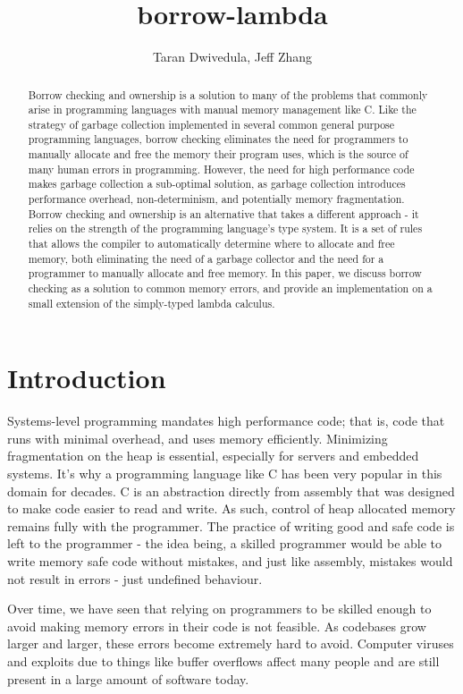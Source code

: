 \documentclass[letterpaper,11pt]{article}
\title{borrow-lambda}
\author{Taran Dwivedula, Jeff Zhang}
\begin{document}
\maketitle

\begin{abstract}
    Borrow checking and ownership is a solution to many of the problems that commonly arise in programming languages with manual memory management like C.
    Like the strategy of garbage collection implemented in several common general purpose programming languages, borrow checking eliminates the
    need for programmers to manually allocate and free the memory their program uses, which is the source of many human errors in programming.
    However, the need for high performance code makes garbage collection a sub-optimal solution, as garbage collection introduces performance
    overhead, non-determinism, and potentially memory fragmentation. Borrow checking and ownership is an alternative that takes a different
    approach - it relies on the strength of the programming language's type system. It is a set of rules that allows the compiler to
    automatically determine where to allocate and free memory, both eliminating the need of a garbage collector and the need for a programmer
    to manually allocate and free memory. In this paper, we discuss borrow checking as a solution to common memory errors, and provide
    an implementation on a small extension of the simply-typed lambda calculus.
\end{abstract}

\section{Introduction}
Systems-level programming mandates high performance code; that is, code that runs with minimal overhead, and uses memory efficiently. Minimizing
fragmentation on the heap is essential, especially for servers and embedded systems. It's why a programming language like C has been very popular
in this domain for decades. C is an abstraction directly from assembly that was
designed to make code easier to read and write. As such, control of heap allocated
memory remains fully with the programmer. The practice of writing good and safe code
is left to the programmer - the idea being, a skilled programmer would be able to write
memory safe code without mistakes, and just like assembly, mistakes would not result
in errors - just undefined behaviour.

Over time, we have seen that relying on programmers to be skilled enough to avoid
making memory errors in their code is not feasible. As codebases grow larger and larger,
these errors become extremely hard to avoid. Computer viruses and exploits due to
things like buffer overflows affect many people and are still present in a large
amount of software today.
\end{document}
